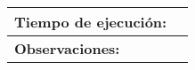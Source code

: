 \begin{longtable}{|l|l|}
\hline
\textbf{Tiempo de ejecución:}                                                                  &                                                                                                                                                                                                                                                                                                                                                                                                                                                                                  \\ 
\hline
\textbf{Observaciones:}                                                                        &                                                                                                                                                                                                                                                                                                                          \\
\hline
\end{longtable}
